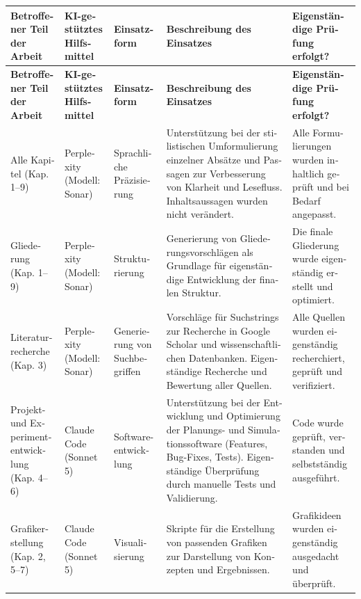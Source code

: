 \begin{otherlanguage}{ngerman}
{\footnotesize
\renewcommand{\arraystretch}{1.4}
\begin{longtable}{|p{2.8cm}|p{2.2cm}|p{2.2cm}|p{5cm}|p{2.8cm}|}
\hline
\textbf{Betroffener Teil der Arbeit} & \textbf{KI-gestütztes Hilfsmittel} & \textbf{Einsatzform} & \textbf{Beschreibung des Einsatzes} & \textbf{Eigenständige Prüfung erfolgt?} \\
\hline
\endfirsthead
\hline
\textbf{Betroffener Teil der Arbeit} & \textbf{KI-gestütztes Hilfsmittel} & \textbf{Einsatzform} & \textbf{Beschreibung des Einsatzes} & \textbf{Eigenständige Prüfung erfolgt?} \\
\hline
\endhead
\hline
\endfoot
Alle Kapitel (Kap. 1--9) & Perplexity (Modell: Sonar) & Sprachliche Präzisierung & Unterstützung bei der stilistischen Umformulierung einzelner Absätze und Passagen zur Verbesserung von Klarheit und Lesefluss. Inhaltsaussagen wurden nicht verändert. & Alle Formulierungen wurden inhaltlich geprüft und bei Bedarf angepasst. \\
\hline
Gliederung (Kap. 1--9) & Perplexity (Modell: Sonar) & Strukturierung & Generierung von Gliederungsvorschlägen als Grundlage für eigenständige Entwicklung der finalen Struktur. & Die finale Gliederung wurde eigenständig erstellt und optimiert. \\
\hline
Literaturrecherche (Kap. 3) & Perplexity (Modell: Sonar) & Generierung von Suchbegriffen & Vorschläge für Suchstrings zur Recherche in Google Scholar und wissenschaftlichen Datenbanken. Eigenständige Recherche und Bewertung aller Quellen. & Alle Quellen wurden eigenständig recherchiert, geprüft und verifiziert. \\
\hline
Projekt- und Experimententwicklung (Kap. 4--6) & Claude Code (Sonnet 5) & Software-entwicklung & Unterstützung bei der Entwicklung und Optimierung der Planungs- und Simulationssoftware (Features, Bug-Fixes, Tests). Eigenständige Überprüfung durch manuelle Tests und Validierung. & Code wurde geprüft, verstanden und selbstständig ausgeführt. \\
\hline
Grafikerstellung (Kap. 2, 5--7) & Claude Code (Sonnet 5) & Visualisierung & Skripte für die Erstellung von passenden Grafiken zur Darstellung von Konzepten und Ergebnissen. & Grafikideen wurden eigenständig ausgedacht und überprüft. \\
\hline
\end{longtable}
}

\end{otherlanguage}
